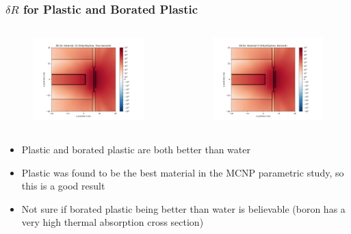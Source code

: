\documentclass[t]{beamer}
\begin{document}
\begin{frame}
  \frametitle{$\delta R$ for Plastic and Borated Plastic}
  \vskip-0.3in
  \begin{columns}
    \begin{figure}
      \includegraphics[trim={0.7in 0.15in 1.05in 0.4in},clip,scale=0.36]{images/dR_10.png}
    \end{figure}
    \begin{figure}
      \includegraphics[trim={0.7in 0.15in 1.05in 0.4in},clip,scale=0.36]{images/dR_09.png}
    \end{figure}
  \end{columns}
  \begin{itemize}
    \item Plastic and borated plastic are both better than water
    \item Plastic was found to be the best material in the MCNP parametric
          study, so this is a good result
    \item Not sure if borated plastic being better than water is believable
          (boron has a very high thermal absorption cross section)
  \end{itemize}
\end{frame}
\end{document}
